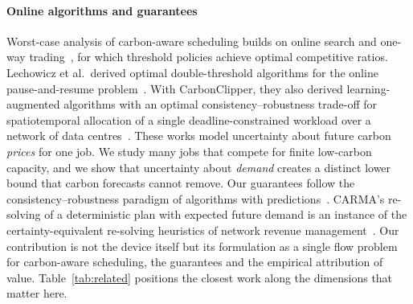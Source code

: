 \paragraph{Online algorithms and guarantees} Worst-case analysis of carbon-aware scheduling builds on online search and one-way trading~\cite{elyaniv2001optimal}, for which threshold policies achieve optimal competitive ratios. Lechowicz et al.\ derived optimal double-threshold algorithms for the online pause-and-resume problem~\cite{lechowicz2023online}. With CarbonClipper, they also derived learning-augmented algorithms with an optimal consistency--robustness trade-off for spatiotemporal allocation of a single deadline-constrained workload over a network of data centres~\cite{lechowicz2025learning}. These works model uncertainty about future carbon \emph{prices} for one job. We study many jobs that compete for finite low-carbon capacity, and we show that uncertainty about \emph{demand} creates a distinct lower bound that carbon forecasts cannot remove. Our guarantees follow the consistency--robustness paradigm of algorithms with predictions~\cite{lykouris2021competitive}. CARMA's re-solving of a deterministic plan with expected future demand is an instance of the certainty-equivalent re-solving heuristics of network revenue management~\cite{jasin2012resolving}. Our contribution is not the device itself but its formulation as a single flow problem for carbon-aware scheduling, the guarantees and the empirical attribution of value. Table~\ref{tab:related} positions the closest work along the dimensions that matter here.

